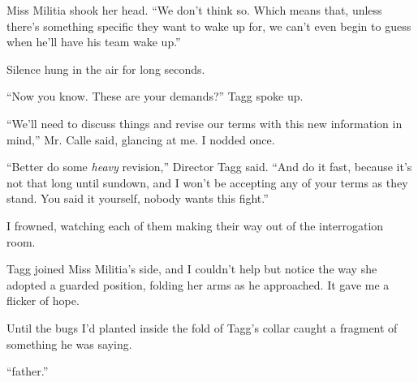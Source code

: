 Miss Militia shook her head.  ``We don't think so.  Which means that, unless there's something specific they want to wake up for, we can't even begin to guess when he'll have his team wake up.''



Silence hung in the air for long seconds.



``Now you know.  These are your demands?''  Tagg spoke up.



``We'll need to discuss things and revise our terms with this new information in mind,'' Mr. Calle said, glancing at me.  I nodded once.



``Better do some \emph{heavy} revision,'' Director Tagg said.  ``And do it fast, because it's not that long until sundown, and I won't be accepting any of your terms as they stand.  You said it yourself, nobody wants this fight.''



I frowned, watching each of them making their way out of the interrogation room.



Tagg joined Miss Militia's side, and I couldn't help but notice the way she adopted a guarded position, folding her arms as he approached.  It gave me a flicker of hope.



Until the bugs I'd planted inside the fold of Tagg's collar caught a fragment of something he was saying.



``\ldotsher father.''





